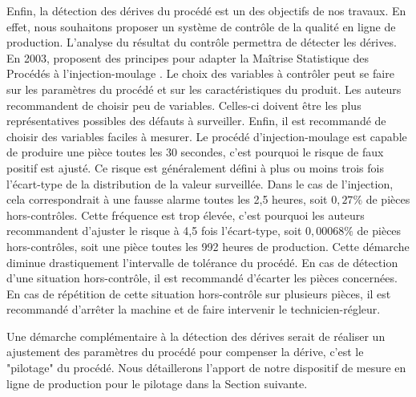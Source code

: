 Enfin, la détection des dérives du procédé est un des objectifs de nos travaux.
En effet, nous souhaitons proposer un système de contrôle de la qualité en ligne de production.
L'analyse du résultat du contrôle permettra de détecter les dérives.
En 2003, \citeauthor{pillet_maitrise_2003} proposent des principes pour adapter la Maîtrise Statistique des Procédés à l'injection-moulage \cite{pillet_maitrise_2003}.
Le choix des variables à contrôler peut se faire sur les paramètres du procédé et sur les caractéristiques du produit.
Les auteurs recommandent de choisir peu de variables.
Celles-ci doivent être les plus représentatives possibles des défauts à surveiller.
Enfin, il est recommandé de choisir des variables faciles à mesurer.
Le procédé d'injection-moulage est capable de produire une pièce toutes les 30 secondes, c'est pourquoi le risque de faux positif est ajusté.
Ce risque est généralement défini à plus ou moins trois fois l'écart-type de la distribution de la valeur surveillée.
Dans le cas de l'injection, cela correspondrait à une fausse alarme toutes les 2,5 heures, soit $0,27\%$ de pièces hors-contrôles.
Cette fréquence est trop élevée, c'est pourquoi les auteurs recommandent d'ajuster le risque à 4,5 fois l'écart-type, soit $0,00068\%$ de pièces hors-contrôles, soit une pièce toutes les 992 heures de production.
Cette démarche diminue drastiquement l'intervalle de tolérance du procédé.
En cas de détection d'une situation hors-contrôle, il est recommandé d'écarter les pièces concernées.
En cas de répétition de cette situation hors-contrôle sur plusieurs pièces, il est recommandé d'arrêter la machine et de faire intervenir le technicien-régleur.

Une démarche complémentaire à la détection des dérives serait de réaliser un ajustement des paramètres du procédé pour compenser la dérive, c'est le "pilotage" du procédé.
Nous détaillerons l'apport de notre dispositif de  mesure en ligne de production pour le pilotage dans la Section suivante.





